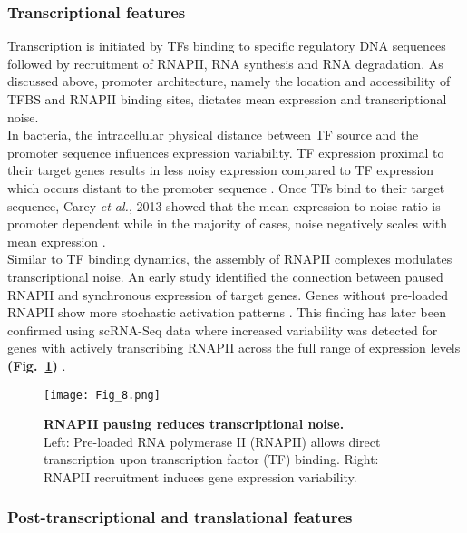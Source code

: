 \subsubsection{Transcriptional features}

Transcription is initiated by TFs binding to specific regulatory DNA sequences followed by recruitment of RNAPII, RNA synthesis and RNA degradation. 
As discussed above, promoter architecture, namely the location and accessibility of TFBS and RNAPII binding sites, dictates mean expression and transcriptional noise. \\

In bacteria, the intracellular physical distance between TF source and the promoter sequence influences expression variability. 
TF expression proximal to their target genes results in less noisy expression compared to TF expression which occurs distant to the promoter sequence \citep{Goni-Moreno2017}. 
Once TFs bind to their target sequence, Carey \emph{et al.}, 2013 showed that the mean expression to noise ratio is promoter dependent while in the majority of cases, noise negatively scales with mean expression \citep{Carey2013}. \\

Similar to TF binding dynamics, the assembly of RNAPII complexes modulates transcriptional noise. 
An early study identified the connection between paused RNAPII and synchronous expression of target genes. 
Genes without pre-loaded RNAPII show more stochastic activation patterns \citep{Boettiger2009}. 
This finding has later been confirmed using scRNA-Seq data where increased variability was detected for genes with actively transcribing RNAPII across the full range of expression levels \textbf{(Fig.~\ref{fig0:RNAPII})} \citep{Day2016}.\\

\begin{figure}[!h]
\centering
\texttt{[image: Fig\_8.png]}
\caption[RNAPII pausing reduces transcriptional noise]{\textbf{RNAPII pausing reduces transcriptional noise.}\\
Left: Pre-loaded RNA polymerase II (RNAPII) allows direct transcription upon transcription factor (TF) binding. Right: RNAPII recruitment induces gene expression variability.}
\label{fig0:RNAPII}
\end{figure} 

\newpage

\subsubsection{Post-transcriptional and translational features}

